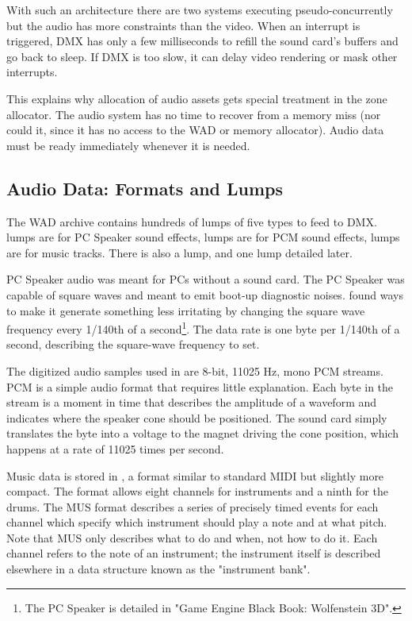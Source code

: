
With such an architecture there are two systems executing pseudo-concurrently but the audio has more constraints than the video. When an interrupt is triggered, DMX has only a few milliseconds to refill the sound card's buffers and go back to sleep. If DMX is too slow, it can delay video rendering or mask other interrupts.\\
\par
 This explains why allocation of audio assets gets special treatment in the zone allocator. The audio system has no time to recover from a memory miss (nor could it, since it has no access to the WAD or memory allocator). Audio data must be ready immediately whenever it is needed.

\subsection{Audio Data: Formats and Lumps}
The WAD archive contains hundreds of lumps of five types to feed to DMX.  lumps are for PC Speaker sound effects,  lumps are for PCM sound effects,  lumps are for music tracks. There is also a  lump, and one  lump detailed later.\\
\par
PC Speaker audio was meant for PCs without a sound card. The PC Speaker was capable of square waves and meant to emit boot-up diagnostic noises. \doom{} found ways to make it generate something less irritating by changing the square wave frequency every 1/140th of a second\footnote{The PC Speaker is detailed in "Game Engine Black Book: Wolfenstein 3D".}. The data rate is one byte per 1/140th of a second, describing the square-wave frequency to set.\\
\par
The digitized audio samples used in \doom{} are 8-bit, 11025 Hz, mono PCM streams. PCM is a simple audio format that requires little explanation. Each byte in the stream is a moment in time that describes the amplitude of a waveform and indicates where the speaker cone should be positioned. The sound card simply translates the byte into a voltage to the magnet driving the cone position, which happens at a rate of 11025 times per second.\\
\par
Music data is stored in , a format similar to standard MIDI but slightly more compact. The format allows eight channels for instruments and a ninth for the drums. The MUS format describes a series of precisely timed events for each channel which specify which instrument should play a note and at what pitch. Note that MUS only describes what to do and when, not how to do it. Each channel refers to the note of an instrument; the instrument itself is described elsewhere in a data structure known as the "instrument bank".\\
